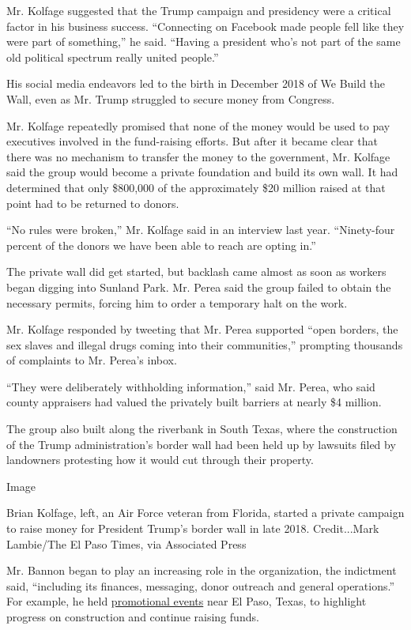 Mr. Kolfage suggested that the Trump campaign and presidency were a
critical factor in his business success. ``Connecting on Facebook made
people fell like they were part of something,'' he said. ``Having a
president who's not part of the same old political spectrum really
united people.''

His social media endeavors led to the birth in December 2018 of We Build
the Wall, even as Mr. Trump struggled to secure money from Congress.

Mr. Kolfage repeatedly promised that none of the money would be used to
pay executives involved in the fund-raising efforts. But after it became
clear that there was no mechanism to transfer the money to the
government, Mr. Kolfage said the group would become a private foundation
and build its own wall. It had determined that only \$800,000 of the
approximately \$20 million raised at that point had to be returned to
donors.

``No rules were broken,'' Mr. Kolfage said in an interview last year.
``Ninety-four percent of the donors we have been able to reach are
opting in.''

The private wall did get started, but backlash came almost as soon as
workers began digging into Sunland Park. Mr. Perea said the group failed
to obtain the necessary permits, forcing him to order a temporary halt
on the work.

Mr. Kolfage responded by tweeting that Mr. Perea supported ``open
borders, the sex slaves and illegal drugs coming into their
communities,'' prompting thousands of complaints to Mr. Perea's inbox.

``They were deliberately withholding information,'' said Mr. Perea, who
said county appraisers had valued the privately built barriers at nearly
\$4 million.

The group also built along the riverbank in South Texas, where the
construction of the Trump administration's border wall had been held up
by lawsuits filed by landowners protesting how it would cut through
their property.

Image

Brian Kolfage, left, an Air Force veteran from Florida, started a
private campaign to raise money for President Trump's border wall in
late 2018. Credit...Mark Lambie/The El Paso Times, via Associated Press

Mr. Bannon began to play an increasing role in the organization, the
indictment said, ``including its finances, messaging, donor outreach and
general operations.'' For example, he held
\href{https://www.youtube.com/watch?v=RvhZO5fNr-8}{promotional events}
near El Paso, Texas, to highlight progress on construction and continue
raising funds.


